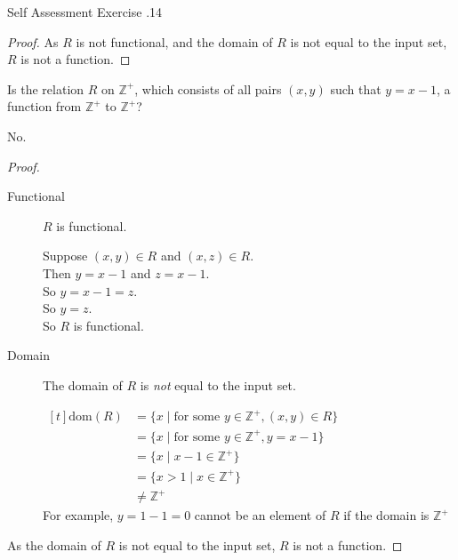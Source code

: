 \documentclass[\main/notes.tex]{subfiles}
\begin{document}
\begin{exercise}{Self Assessment Exercise \thechapter.14}
\begin{questions}
\begin{questions}
\begin{answer}
\begin{proof}
											As $R$ is not functional, and the domain of $R$ is not equal to the input set, $R$ is not a function.
										\end{proof}
									\end{answer}
							\end{questions}
						\item Is the relation $R$ on $\mathbb{Z}^{+}$, which consists of all pairs $(x, y)$ such that $y = x - 1$, a function from $\mathbb{Z}^{+}$ to $\mathbb{Z}^{+}$?\\
							\begin{answer}
								No.
								\begin{proof}
									$ $
									\begin{description}
										\item[Functional] $R$ is functional.
											\begin{subproof}[Subproof]
												Suppose $(x, y) \in R$ and $(x, z) \in R$.\\
												Then $y = x - 1$ and $z = x - 1$.\\
												So $y = x - 1 = z$.\\
												So $y = z$.\\
												So $R$ is functional.
											\end{subproof}
										\item[Domain] The domain of $R$ is \emph{not} equal to the input set.
											\begin{subproof}[Subproof] $
												\begin{aligned}[t]
													\mathrm{dom}(R) &= \bigl\{x \mid \text{for some } y \in \mathbb{Z}^{+}, (x, y) \in R\bigr\}\\
													&= \bigl\{x \mid \text{for some } y \in \mathbb{Z}^{+}, y = x - 1\bigr\}\\
													&= \bigl\{x \mid x - 1 \in \mathbb{Z}^{+}\bigr\}\\
													&= \bigl\{x > 1 \mid x \in \mathbb{Z}^{+}\bigr\}\\
													& \neq \mathbb{Z}^{+}
												\end{aligned} $\\
												For example, $y = 1 - 1 = 0$ cannot be an element of $R$ if the domain is $\mathbb{Z}^{+}$
											\end{subproof}
									\end{description}
									As the domain of $R$ is not equal to the input set, $R$ is not a function.
								\end{proof}

\end{answer}
\end{questions}
\end{exercise}
\end{document}
